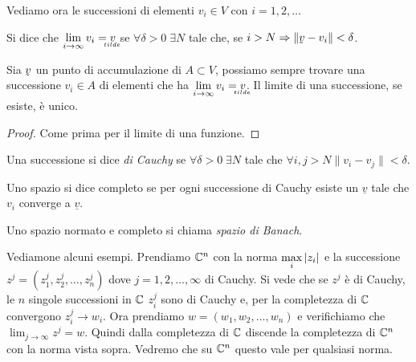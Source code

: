 Vediamo ora le successioni di elementi $v_i \in V$ con $i = 1,2, \ldots$
\begin{definition}
Si dice che $\displaystyle \lim_{i \to \infty} v_i = \underaccent{tilde}{v}$
se $\forall \delta > 0 \; \exists N$ tale che, se $i > N \Rightarrow
\|\underaccent{\tilde}{v} - v_i\| < \delta$.
\end{definition}
\begin{theorem}
Sia $\underaccent{\tilde}{v}$ un punto di accumulazione di $A \subset V$,
possiamo sempre trovare una successione $v_i \in A$ di elementi che ha
$\displaystyle \lim_{i \to \infty} v_i = \underaccent{tilde}{v}$.
Il limite di una successione, se esiste, è unico.
\end{theorem}
\begin{proof}
Come prima per il limite di una funzione.	
\end{proof}
\begin{definition}
Una successione si dice \emph{di Cauchy} se $\forall \delta > 0 \; \exists N$
tale che $\forall i, j > N \|v_i - v_j\| < \delta$.
\end{definition}
\begin{definition}[completezza]
Uno spazio si dice completo se per ogni successione di Cauchy esiste un
$\underline{v}$ tale che $v_i$ converge a $\underline{v}$.
\end{definition}
\begin{definition}
Uno spazio normato e completo si chiama \emph{spazio di Banach}.
\end{definition}

Vediamone alcuni esempi. Prendiamo $\mathbb C^n$ con la norma $\displaystyle \max_i
{\left|z_i\right|}$ e la successione $z^j =  \left(z_1^j, z_2^j, \ldots, z_n^j \right)$
dove $j = 1, 2, \ldots, \infty$ di Cauchy. Si vede che se $z^j$ è di Cauchy,
le $n$ singole successioni in $\mathbb C$ $z_i^j$ sono di Cauchy e, per la
completezza di $\mathbb C$ convergono $z_i^j \to w_i$.
Ora prendiamo $w = \left(w_1, w_2, \ldots, w_n \right)$ e verifichiamo che
$\displaystyle \lim_{j \to \infty} z^j = w$. Quindi dalla completezza di $\mathbb C$ 
discende la completezza di $\mathbb C^n$ con la norma vista sopra. Vedremo che su
$\mathbb C^n$ questo vale per qualsiasi norma.

